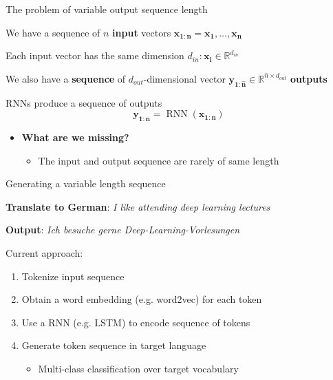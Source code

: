 \documentclass[12pt,aspectratio=169,handout]{beamer}
\DeclareMathOperator*{\rnn}{RNN}
\begin{document}
\begin{frame}{The problem of variable output sequence length}


We have a sequence of $n$ \textbf{input} vectors $\bm{x_{1:n}} = \bm{x_1}, \ldots, \bm{x_n}$

Each input vector has the same dimension $d_{in}: \bm{x_i} \in \mathbb{R}^{d_{in}}$

\bigskip

\pause
We also have a \textbf{sequence} of $d_{out}$-dimensional vector $\bm{y_{1:\hat{n}}} \in \mathbb{R}^{\hat{n} \times d_{out}}$ \textbf{outputs} 

\bigskip

\pause
RNNs produce a sequence of outputs %
	$$
	\bm{y_{1:n}} = \rnn (\bm{x_{1:n}})
	$$
\begin{itemize}
	\item \textbf{What are we missing?}
	\pause
	\begin{itemize}
		\item The input and output sequence are rarely of same length 
	\end{itemize}
\end{itemize}	

\end{frame}

\begin{frame}{Generating a variable length sequence}

	\textbf{Translate to German}: \textit{I like attending deep learning lectures}

	\pause

	\textbf{Output}: \textit{Ich besuche gerne Deep-Learning-Vorlesungen}

	\pause

	Current approach:
	\begin{enumerate}
		\item Tokenize input sequence
		\item Obtain a word embedding (e.g. word2vec) for each token
		\item Use a RNN (e.g. LSTM) to encode sequence of tokens
		\item Generate token sequence in target language
		\pause
		\begin{itemize}
			\item Multi-class classification over target vocabulary
		\end{itemize}
	\end{enumerate}

\end{frame}
\end{document}
